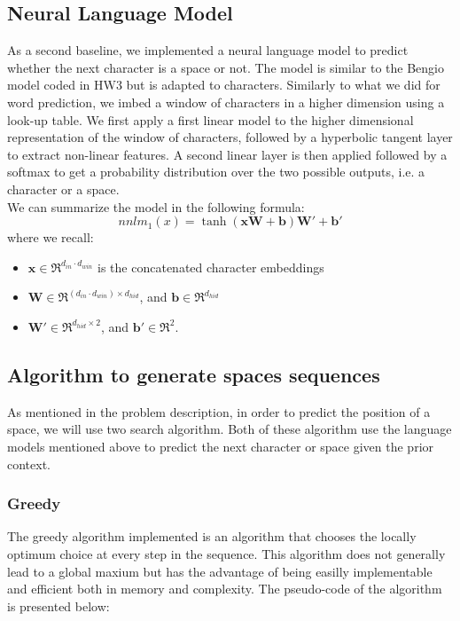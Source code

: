 \documentclass[11pt]{article}
\begin{document}
\subsection{Neural Language Model}
As a second baseline, we implemented a neural language model to predict whether the next character is a space or not. The model is similar to the Bengio model coded in HW3 but is adapted to characters. Similarly to what we did for word prediction, we imbed a window of characters in a higher dimension using a look-up table. We first apply a first linear model to the higher dimensional representation of the window of characters, followed by a hyperbolic tangent layer to extract non-linear features. A second linear layer is then applied followed by a softmax to get a probability distribution over the two possible outputs, i.e. a character or a space.\\
\noindent We can summarize the model in the following formula: $$nnlm_1(x) = \tanh(\mathbf{xW}+\mathbf{b})\mathbf{W'}+\mathbf{b'}$$
where we recall:
\begin{itemize}
\item $\boldsymbol{x}\in \Re^{d_{in}\cdot d_{win}}$ is the concatenated character embeddings
\item $\boldsymbol{W}\in \Re^{(d_{in}\cdot d_{win})\times d_{hid}}$, and $\boldsymbol{b}\in \Re^{d_{hid}}$
\item $\boldsymbol{W'}\in \Re^{d_{hid}\times 2}$, and $\boldsymbol{b'}\in \Re^{2}$.
\end{itemize}


\subsection{Algorithm to generate spaces sequences}
As mentioned in the problem description, in order to predict the position of a space, we will use two search algorithm. Both of these algorithm use the language models mentioned above to predict the next character or space given the prior context.

\subsubsection{Greedy}
The greedy algorithm implemented is an algorithm that chooses the locally optimum choice at every step in the sequence. This algorithm does not generally lead to a global maxium but has the advantage of being easilly implementable and efficient both in memory and complexity. The pseudo-code of the algorithm is presented below:
\end{document}
